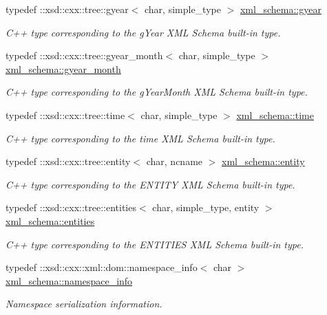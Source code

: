 \begin{DoxyCompactItemize}
typedef \+::xsd\+::cxx\+::tree\+::gyear$<$ char, simple\+\_\+type $>$ \hyperlink{namespacexml__schema_ab0d28a4409143544c8f43bbcc1edeac2}{xml\+\_\+schema\+::gyear}
\begin{DoxyCompactList}\small\item\em C++ type corresponding to the g\+Year X\+M\+L Schema built-\/in type. \end{DoxyCompactList}\item 
typedef \+::xsd\+::cxx\+::tree\+::gyear\+\_\+month$<$ char, simple\+\_\+type $>$ \hyperlink{namespacexml__schema_acedc1f185fe9175cad53266824897573}{xml\+\_\+schema\+::gyear\+\_\+month}
\begin{DoxyCompactList}\small\item\em C++ type corresponding to the g\+Year\+Month X\+M\+L Schema built-\/in type. \end{DoxyCompactList}\item 
typedef \+::xsd\+::cxx\+::tree\+::time$<$ char, simple\+\_\+type $>$ \hyperlink{namespacexml__schema_a75a88454d26d1fbbe712e22e9e994cee}{xml\+\_\+schema\+::time}
\begin{DoxyCompactList}\small\item\em C++ type corresponding to the time X\+M\+L Schema built-\/in type. \end{DoxyCompactList}\item 
typedef \+::xsd\+::cxx\+::tree\+::entity$<$ char, ncname $>$ \hyperlink{namespacexml__schema_a871d3ae7ead81c6fc7ff7d37cd5f4c8f}{xml\+\_\+schema\+::entity}
\begin{DoxyCompactList}\small\item\em C++ type corresponding to the E\+N\+T\+I\+T\+Y X\+M\+L Schema built-\/in type. \end{DoxyCompactList}\item 
typedef \+::xsd\+::cxx\+::tree\+::entities$<$ char, simple\+\_\+type, entity $>$ \hyperlink{namespacexml__schema_ad9a0d0d60ff45d5f4a4086a502b9599b}{xml\+\_\+schema\+::entities}
\begin{DoxyCompactList}\small\item\em C++ type corresponding to the E\+N\+T\+I\+T\+I\+E\+S X\+M\+L Schema built-\/in type. \end{DoxyCompactList}\item 
typedef \+::xsd\+::cxx\+::xml\+::dom\+::namespace\+\_\+info$<$ char $>$ \hyperlink{namespacexml__schema_a21061cbf10bfd5a1c98489f10429786e}{xml\+\_\+schema\+::namespace\+\_\+info}
\begin{DoxyCompactList}\small\item\em Namespace serialization information. \end{DoxyCompactList}\item 

\end{DoxyCompactItemize}
